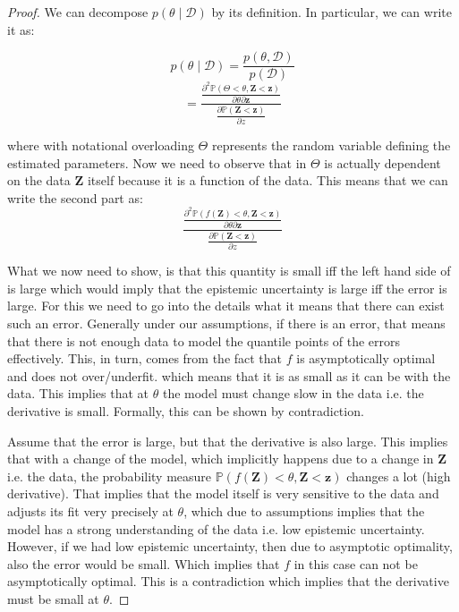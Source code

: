 \begin{proof}
    We can decompose $p(\theta \mid \mathcal{D})$ by its definition. In particular, we can write it as:

    \begin{equation}
        p(\theta \mid \mathcal{D}) = \frac{p(\theta, \mathcal{D})}{p(\mathcal{D})}
    \end{equation}
    \begin{equation}
        = \frac{\frac{\partial^2 \mathbb{P}(\Theta < \theta, \mathbf{Z} < \mathbf{z})}{\partial \theta \partial \mathbf{z}}}{\frac{\partial \mathbb{P}(\mathbf{Z} < \mathbf{z})}{\partial z}}
        \label{eq:epistemic_uncertainty1}
    \end{equation}

    where with notational overloading $\Theta$ represents the random variable defining the estimated parameters. Now we need to observe that in  $\Theta$ is actually dependent on the data $\mathbf{Z}$ itself because it is a function of the data. This means that we can write the second part as:
    \begin{equation}
        \frac{\frac{\partial^2 \mathbb{P}(f(\mathbf{Z}) < \theta, \mathbf{Z} < \mathbf{z})}{\partial \theta \partial \mathbf{z}}}{\frac{\partial \mathbb{P}(\mathbf{Z} < \mathbf{z})}{\partial z}}
        \label{eq:epistemic_uncertainty2}
    \end{equation}

    What we now need to show, is that this quantity is small iff the left hand side of  is large which would imply that the epistemic uncertainty is large iff the error is large. For this we need to go into the details what it means that there can exist such an error. Generally under our assumptions, if there is an error, that means that there is not enough data to model the quantile points of the errors effectively. This, in turn, comes from the fact that $f$ is asymptotically optimal and does not over/underfit. which means that it is as small as it can be with the data. This implies that at $\theta$ the model must change slow in the data i.e. the derivative is small. Formally, this can be shown by contradiction.

    Assume that the error is large, but that the derivative is also large. This implies that with a change of the model, which implicitly happens due to a change in $\mathbf{Z}$ i.e. the data, the probability measure $\mathbb{P}(f(\mathbf{Z}) < \theta, \mathbf{Z} < \mathbf{z})$ changes a lot (high derivative). That implies that the model itself is very sensitive to the data and adjusts its fit very precisely at $\theta$, which due to assumptions implies that the model has a strong understanding of the data i.e. low epistemic uncertainty. However, if we had low epistemic uncertainty, then due to asymptotic optimality, also the error would be small. Which implies that $f$ in this case can not be asymptotically optimal. This is a contradiction which implies that the derivative must be small at $\theta$.


\end{proof}
